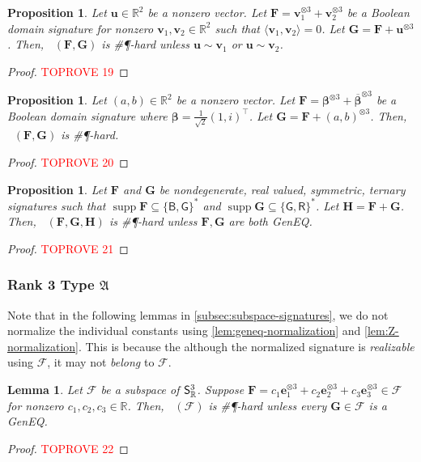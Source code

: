 \documentclass[11pt]{article}
\newtheorem{lemma}[theorem]{Lemma}
\newtheorem{proposition}[theorem]{Proposition}
\DeclareMathOperator{\holbs}{Holant^*_2}
\DeclareMathOperator{\holts}{Holant^*_3}
\DeclareMathOperator{\supp}{supp}
\newcommand{\db}{\mathsf{B}}
\newcommand{\dg}{\mathsf{G}}
\newcommand{\dr}{\mathsf{R}}
\newcommand{\geneq}{\textsf{GenEQ}\xspace}
\newcommand{\sph}{\#\P-hard\xspace}
\newcommand{\teh}{^{\otimes 3}}
\newcommand{\transpose}{^\intercal}
\newcommand{\ternarytractgeneq}{$\mathfrak{A}$\xspace}
\begin{document}
\begin{proposition}\label{prop:geneq-sum-hard}
Let $\mathbf{u} \in \mathbb{R}^2$ be a nonzero vector.
Let $\mathbf{F} = \mathbf{v}_1\teh + \mathbf{v}_2 \teh$ be a Boolean domain signature for nonzero $\mathbf{v}_1, \mathbf{v}_2 \in \mathbb{R}^2$ such that $\langle \mathbf{v}_1, \mathbf{v}_2 \rangle = 0$.
Let $\mathbf{G} = \mathbf{F} + \mathbf{u}\teh$.
Then, $\holbs(\mathbf{F}, \mathbf{G})$ is \sph unless $\mathbf{u} \sim \mathbf{v}_1$ or $\mathbf{u} \sim \mathbf{v}_2$.
\end{proposition}
\begin{proof}\textcolor{red}{TOPROVE 19}\end{proof}
\begin{proposition}\label{prop:z-sum-hard}
Let $(a, b) \in \mathbb{R}^2$ be a nonzero vector.
Let $\mathbf{F} = \boldsymbol{\beta}\teh + \overline{\boldsymbol{\beta}}\teh$ be a Boolean domain signature where $\boldsymbol{\beta} = \frac{1}{\sqrt{2}}(1, i)\transpose$.
Let $\mathbf{G} = \mathbf{F} + (a, b)\teh$.
Then, $\holbs(\mathbf{F}, \mathbf{G})$ is \sph.
\end{proposition}
\begin{proof}\textcolor{red}{TOPROVE 20}\end{proof}
\begin{proposition}\label{prop:bg-gr-sum-hard}
Let $\mathbf{F}$ and $\mathbf{G}$ be nondegenerate, real valued, symmetric, ternary signatures such that $\supp \mathbf{F} \subseteq \{\db, \dg\}^*$ and $\supp \mathbf{G} \subseteq \{\dg, \dr\}^*$.
Let $\mathbf{H} = \mathbf{F} + \mathbf{G}$.
Then, $\holts(\mathbf{F}, \mathbf{G}, \mathbf{H})$ is \sph unless $\mathbf{F}, \mathbf{G}$ are both \geneq.
\end{proposition}
\begin{proof}\textcolor{red}{TOPROVE 21}\end{proof}

\subsubsection{Rank 3 Type \texorpdfstring{\ternarytractgeneq}{A}}
Note that in the following lemmas in \cref{subsec:subspace-signatures}, we do not normalize the individual constants using \cref{lem:geneq-normalization} and \cref{lem:Z-normalization}. This is because the although the normalized signature is \textit{realizable} using $\mathscr{F}$, it may not \textit{belong} to $\mathscr{F}$.
\begin{lemma}\label{lem:dichotomy-subspace-rank-3-geneq}
  Let $\mathscr{F}$ be a subspace of $\mathsf{S}^3_{\mathbb{R}}$.
  Suppose $\mathbf{F} = c_1 \mathbf{e}_1\teh + c_2 \mathbf{e}_2\teh + c_3 \mathbf{e}_3 \teh \in \mathscr{F}$ for nonzero $c_1, c_2, c_3 \in \mathbb{R}$.
  Then, $\holts(\mathscr{F})$ is \sph unless every $\mathbf{G} \in \mathscr{F}$ is a \geneq.
\end{lemma}
\begin{proof}\textcolor{red}{TOPROVE 22}\end{proof}
\end{document}
